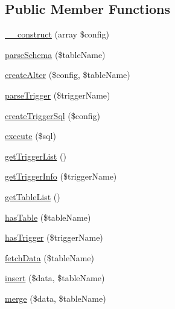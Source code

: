 \subsection*{Public Member Functions}
\begin{DoxyCompactItemize}
\item 
\hyperlink{interfaceDbSync__Table__DbAdapter__AdapterInterface_acc52a558483c38b43d6c18de8d4af91c}{\_\-\_\-construct} (array \$config)
\item 
\hyperlink{interfaceDbSync__Table__DbAdapter__AdapterInterface_a44145e9ba3c9b176a846da4ec66b7709}{parseSchema} (\$tableName)
\item 
\hyperlink{interfaceDbSync__Table__DbAdapter__AdapterInterface_a5f0411aefd4e61b222c764523247089e}{createAlter} (\$config, \$tableName)
\item 
\hyperlink{interfaceDbSync__Table__DbAdapter__AdapterInterface_ac1a512f5f8995ab0cd14ebd8d6c8b4e5}{parseTrigger} (\$triggerName)
\item 
\hyperlink{interfaceDbSync__Table__DbAdapter__AdapterInterface_a9a5ea8d6bef1df0bfc0093e1ae513cde}{createTriggerSql} (\$config)
\item 
\hyperlink{interfaceDbSync__Table__DbAdapter__AdapterInterface_a201d09901524162b392e46774ed065c3}{execute} (\$sql)
\item 
\hyperlink{interfaceDbSync__Table__DbAdapter__AdapterInterface_aaea3134a13d12afd23e1fa1d44374736}{getTriggerList} ()
\item 
\hyperlink{interfaceDbSync__Table__DbAdapter__AdapterInterface_a2d71d9513cc7f87545f4185d89971191}{getTriggerInfo} (\$triggerName)
\item 
\hyperlink{interfaceDbSync__Table__DbAdapter__AdapterInterface_aa43cca3d069bbb2a1fe9f53310b50291}{getTableList} ()
\item 
\hyperlink{interfaceDbSync__Table__DbAdapter__AdapterInterface_ad407066eea549da5d8c7301476b75070}{hasTable} (\$tableName)
\item 
\hyperlink{interfaceDbSync__Table__DbAdapter__AdapterInterface_a93d8abfed28f5eaff4e4a0e9e944e018}{hasTrigger} (\$triggerName)
\item 
\hyperlink{interfaceDbSync__Table__DbAdapter__AdapterInterface_af67f030f94e4811d4ed55ef844ddda8e}{fetchData} (\$tableName)
\item 
\hyperlink{interfaceDbSync__Table__DbAdapter__AdapterInterface_a6f4051aa7dd67c963f0aaa37c96e319f}{insert} (\$data, \$tableName)
\item 
\hyperlink{interfaceDbSync__Table__DbAdapter__AdapterInterface_a7bfda16afa5d7a8400fe1c3de7dfb5c3}{merge} (\$data, \$tableName)

\end{DoxyCompactItemize}
